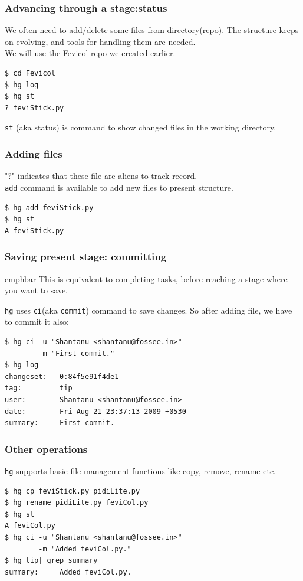 \documentclass[14pt,compress]{beamer}
\newcommand{\emphbar}[1]
{\begin{beamercolorbox}[rounded=true]{emphbar} 
      {#1}
 \end{beamercolorbox}
}
\newcounter{time}
\newcommand{\inctime}[1]{\addtocounter{time}{#1}{\tiny \thetime\ m}}
\newcommand{\typ}[1]{\lstinline{#1}}
\begin{document}
\begin{frame}[fragile]
  \frametitle{Advancing through a stage:status}
  We often need to add/delete some files from directory(repo). The structure keeps on evolving, and tools for handling them are needed.\\
  We will use the Fevicol repo we created earlier.
  \begin{lstlisting}
$ cd Fevicol
$ hg log
$ hg st
? feviStick.py
  \end{lstlisting} %
  \typ{st} (aka status) is command to show changed files in the working directory.\\
\end{frame}

\begin{frame}[fragile]
  \frametitle{Adding files}
  "?" indicates that these file are aliens to track record.\\
  \typ{add} command is available to add new files to present structure.
  \begin{lstlisting}
$ hg add feviStick.py
$ hg st
A feviStick.py
  \end{lstlisting}
\end{frame}

\begin{frame}[fragile]
  \frametitle{Saving present stage: committing}
  \emphbar{This is equivalent to completing tasks, before reaching a stage where you want to save.}
  \typ{hg} uses \typ{ci}(aka \typ{commit}) command to save changes. So after adding file, we have to commit it also:
  \begin{lstlisting}
$ hg ci -u "Shantanu <shantanu@fossee.in>" 
        -m "First commit."
$ hg log
changeset:   0:84f5e91f4de1
tag:         tip
user:        Shantanu <shantanu@fossee.in>
date:        Fri Aug 21 23:37:13 2009 +0530
summary:     First commit.    
  \end{lstlisting}
\end{frame}

\begin{frame}[fragile]
  \frametitle{Other operations}
  \typ{hg} supports basic file-management functions like copy, remove, rename etc.
  \begin{lstlisting}
$ hg cp feviStick.py pidiLite.py
$ hg rename pidiLite.py feviCol.py
$ hg st
A feviCol.py
$ hg ci -u "Shantanu <shantanu@fossee.in>" 
        -m "Added feviCol.py."
$ hg tip| grep summary 
summary:     Added feviCol.py.
  \end{lstlisting} %
  \inctime{10}
\end{frame}
\end{document}
